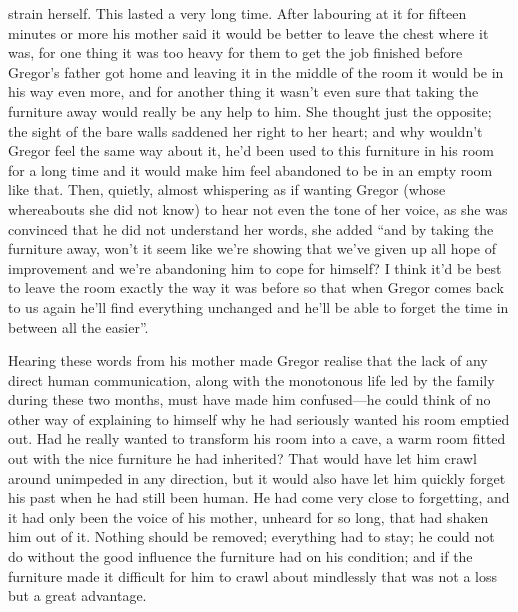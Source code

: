 strain herself. This lasted a very long time. After labouring at it for
fifteen minutes or more his mother said it would be better to leave the
chest where it was, for one thing it was too heavy for them to get the
job finished before Gregor’s father got home and leaving it in the
middle of the room it would be in his way even more, and for another
thing it wasn’t even sure that taking the furniture away would really
be any help to him. She thought just the opposite; the sight of the
bare walls saddened her right to her heart; and why wouldn’t Gregor
feel the same way about it, he’d been used to this furniture in his
room for a long time and it would make him feel abandoned to be in an
empty room like that. Then, quietly, almost whispering as if wanting
Gregor (whose whereabouts she did not know) to hear not even the tone
of her voice, as she was convinced that he did not understand her
words, she added “and by taking the furniture away, won’t it seem like
we’re showing that we’ve given up all hope of improvement and we’re
abandoning him to cope for himself? I think it’d be best to leave the
room exactly the way it was before so that when Gregor comes back to us
again he’ll find everything unchanged and he’ll be able to forget the
time in between all the easier”.

Hearing these words from his mother made Gregor realise that the lack
of any direct human communication, along with the monotonous life led
by the family during these two months, must have made him confused—he
could think of no other way of explaining to himself why he had
seriously wanted his room emptied out. Had he really wanted to
transform his room into a cave, a warm room fitted out with the nice
furniture he had inherited? That would have let him crawl around
unimpeded in any direction, but it would also have let him quickly
forget his past when he had still been human. He had come very close to
forgetting, and it had only been the voice of his mother, unheard for
so long, that had shaken him out of it. Nothing should be removed;
everything had to stay; he could not do without the good influence the
furniture had on his condition; and if the furniture made it difficult
for him to crawl about mindlessly that was not a loss but a great
advantage.

